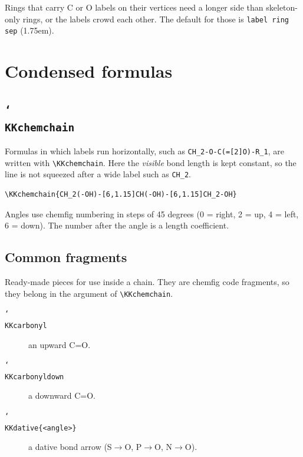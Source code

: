 \documentclass[paper=a4paper,fontsize=10pt]{jlreq}
\begin{document}
Rings that carry C or O labels on their vertices need a longer side than
skeleton-only rings, or the labels crowd each other. The default for those is
\verb|label ring sep| (1.75em).

\section{Condensed formulas}

\subsection{\texttt{\char`\\KKchemchain}}

Formulas in which labels run horizontally, such as
\verb|CH_2-O-C(=[2]O)-R_1|, are written with \verb|\KKchemchain|. Here the
\emph{visible} bond length is kept constant, so the line is not squeezed after a
wide label such as \verb|CH_2|.

\begin{verbatim}
\KKchemchain{CH_2(-OH)-[6,1.15]CH(-OH)-[6,1.15]CH_2-OH}
\end{verbatim}

\begin{center}
\KKglycerol\qquad{}
\end{center}

Angles use \textsf{chemfig} numbering in steps of 45 degrees (0 = right, 2 = up,
4 = left, 6 = down). The number after the angle is a length coefficient.

\subsection{Common fragments}

Ready-made pieces for use inside a chain. They are \textsf{chemfig} code
fragments, so they belong in the argument of \verb|\KKchemchain|.

\begin{description}
\item[\texttt{\char`\\KKcarbonyl}] an upward C=O.
\item[\texttt{\char`\\KKcarbonyldown}] a downward C=O.
\item[\texttt{\char`\\KKdative\{<angle>\}}] a dative bond arrow (S$\to$O, P$\to$O, N$\to$O).
\end{description}
\end{document}
